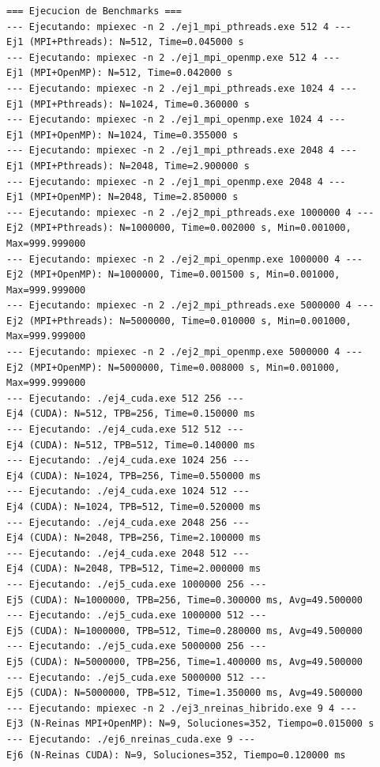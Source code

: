 \documentclass{article}
\begin{document}
\begin{verbatim}
=== Ejecucion de Benchmarks ===
--- Ejecutando: mpiexec -n 2 ./ej1_mpi_pthreads.exe 512 4 ---
Ej1 (MPI+Pthreads): N=512, Time=0.045000 s
--- Ejecutando: mpiexec -n 2 ./ej1_mpi_openmp.exe 512 4 ---
Ej1 (MPI+OpenMP): N=512, Time=0.042000 s
--- Ejecutando: mpiexec -n 2 ./ej1_mpi_pthreads.exe 1024 4 ---
Ej1 (MPI+Pthreads): N=1024, Time=0.360000 s
--- Ejecutando: mpiexec -n 2 ./ej1_mpi_openmp.exe 1024 4 ---
Ej1 (MPI+OpenMP): N=1024, Time=0.355000 s
--- Ejecutando: mpiexec -n 2 ./ej1_mpi_pthreads.exe 2048 4 ---
Ej1 (MPI+Pthreads): N=2048, Time=2.900000 s
--- Ejecutando: mpiexec -n 2 ./ej1_mpi_openmp.exe 2048 4 ---
Ej1 (MPI+OpenMP): N=2048, Time=2.850000 s
--- Ejecutando: mpiexec -n 2 ./ej2_mpi_pthreads.exe 1000000 4 ---
Ej2 (MPI+Pthreads): N=1000000, Time=0.002000 s, Min=0.001000, Max=999.999000
--- Ejecutando: mpiexec -n 2 ./ej2_mpi_openmp.exe 1000000 4 ---
Ej2 (MPI+OpenMP): N=1000000, Time=0.001500 s, Min=0.001000, Max=999.999000
--- Ejecutando: mpiexec -n 2 ./ej2_mpi_pthreads.exe 5000000 4 ---
Ej2 (MPI+Pthreads): N=5000000, Time=0.010000 s, Min=0.001000, Max=999.999000
--- Ejecutando: mpiexec -n 2 ./ej2_mpi_openmp.exe 5000000 4 ---
Ej2 (MPI+OpenMP): N=5000000, Time=0.008000 s, Min=0.001000, Max=999.999000
--- Ejecutando: ./ej4_cuda.exe 512 256 ---
Ej4 (CUDA): N=512, TPB=256, Time=0.150000 ms
--- Ejecutando: ./ej4_cuda.exe 512 512 ---
Ej4 (CUDA): N=512, TPB=512, Time=0.140000 ms
--- Ejecutando: ./ej4_cuda.exe 1024 256 ---
Ej4 (CUDA): N=1024, TPB=256, Time=0.550000 ms
--- Ejecutando: ./ej4_cuda.exe 1024 512 ---
Ej4 (CUDA): N=1024, TPB=512, Time=0.520000 ms
--- Ejecutando: ./ej4_cuda.exe 2048 256 ---
Ej4 (CUDA): N=2048, TPB=256, Time=2.100000 ms
--- Ejecutando: ./ej4_cuda.exe 2048 512 ---
Ej4 (CUDA): N=2048, TPB=512, Time=2.000000 ms
--- Ejecutando: ./ej5_cuda.exe 1000000 256 ---
Ej5 (CUDA): N=1000000, TPB=256, Time=0.300000 ms, Avg=49.500000
--- Ejecutando: ./ej5_cuda.exe 1000000 512 ---
Ej5 (CUDA): N=1000000, TPB=512, Time=0.280000 ms, Avg=49.500000
--- Ejecutando: ./ej5_cuda.exe 5000000 256 ---
Ej5 (CUDA): N=5000000, TPB=256, Time=1.400000 ms, Avg=49.500000
--- Ejecutando: ./ej5_cuda.exe 5000000 512 ---
Ej5 (CUDA): N=5000000, TPB=512, Time=1.350000 ms, Avg=49.500000
--- Ejecutando: mpiexec -n 2 ./ej3_nreinas_hibrido.exe 9 4 ---
Ej3 (N-Reinas MPI+OpenMP): N=9, Soluciones=352, Tiempo=0.015000 s
--- Ejecutando: ./ej6_nreinas_cuda.exe 9 ---
Ej6 (N-Reinas CUDA): N=9, Soluciones=352, Tiempo=0.120000 ms
\end{verbatim}
\end{document}
